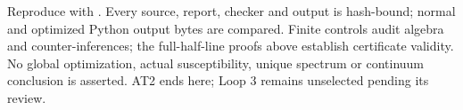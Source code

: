 Reproduce with {\small{}}. Every source, report, checker and output is hash-bound; normal and optimized Python output bytes are compared. Finite controls audit algebra and counter-inferences; the full-half-line proofs above establish certificate validity. No global optimization, actual susceptibility, unique spectrum or continuum conclusion is asserted. AT2 ends here; Loop 3 remains unselected pending its review.

